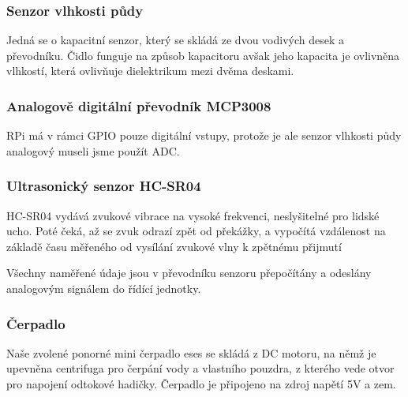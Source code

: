 \documentclass[12pt,a4paper]{article}
\begin{document}
\subsubsection{Senzor vlhkosti půdy}

Jedná se o kapacitní senzor, který se skládá ze dvou vodivých desek a převodníku. Čidlo funguje na způsob kapacitoru avšak jeho kapacita je ovlivněna vlhkostí, která ovlivňuje dielektrikum mezi dvěma deskami.

\subsubsection{Analogově digitální převodník MCP3008}

\ac{RPi} má v rámci \ac{GPIO} pouze digitální vstupy, protože je ale senzor vlhkosti půdy analogový museli jsme použít \ac{ADC}.



\subsubsection{Ultrasonický senzor HC-SR04}

\ac{HC-SR04} vydává zvukové vibrace na vysoké frekvenci, neslyšitelné pro lidské ucho. Poté čeká, až se zvuk odrazí zpět od překážky, a vypočítá vzdálenost na základě času měřeného od vysílání zvukové vlny k zpětnému přijmutí

Všechny naměřené údaje jsou v převodníku senzoru přepočítány a odeslány analogovým signálem do řídící jednotky.

\subsubsection{Čerpadlo}

Naše zvolené ponorné mini čerpadlo eses se skládá z DC motoru, na němž je upevněna centrifuga pro čerpání vody a vlastního pouzdra, z kterého vede otvor pro napojení odtokové hadičky. Čerpadlo je připojeno na zdroj napětí 5V a zem.
\end{document}

